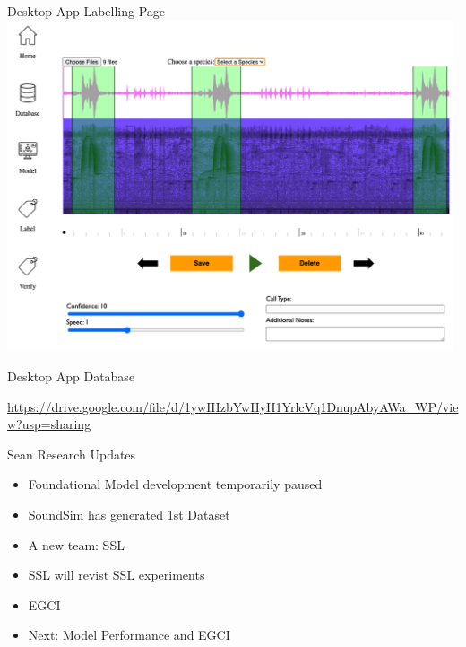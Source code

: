 \begin{frame}{Desktop App Labelling Page}
    \centering
    \includegraphics[height=0.99\textheight,width=0.99\textwidth,keepaspectratio]{images/labelling_page.png}
\end{frame}

\begin{frame}{Desktop App Database}

    \url{https://drive.google.com/file/d/1ywIHzbYwHyH1YrlcVq1DnupAbyAWa_WP/view?usp=sharing}

\end{frame}


\begin{frame}{Sean Research Updates}
    \begin{itemize}
        \item Foundational Model development temporarily paused
        \item SoundSim has generated 1st Dataset
        \item A new team: SSL
        \item SSL will revist SSL experiments
        \item EGCI
        \item Next: Model Performance and EGCI
    \end{itemize}
\end{frame}


